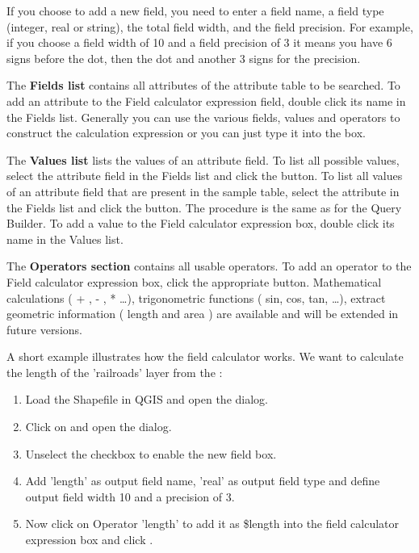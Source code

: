 If you choose to add a new field, you need to enter a field name, a field type 
(integer, real or string), the total field width, and the field precision. 
For example, if you choose a field width of 10 and a field precision of 3 it 
means you have 6 signs before the dot, then the dot and another 3 signs for the 
precision.   

The \textbf{Fields list} contains all attributes of the attribute table to be
searched. To add an attribute to the Field calculator expression field, double 
click its name in the Fields list. Generally you can use the various fields, 
values and operators to construct the calculation expression or you can just 
type it into the box.

The \textbf{Values list} lists the values of an attribute field. To list all 
possible values, select the attribute field in the Fields list and click the
 button. To list all 
values of an attribute field that are present in the sample table, select the 
attribute in the Fields list and click the  button. The procedure is the same as for the Query 
Builder. To add a value to the Field calculator expression box, double click its 
name in the Values list.

The \textbf{Operators section} contains all usable operators. To add an operator
to the Field calculator expression box, click the appropriate button. Mathematical 
calculations ( + , - , * \dots), trigonometric functions ( sin, cos, tan, \dots), 
extract geometric information ( length and area ) are available and will be 
extended in future versions.

A short example illustrates how the field calculator works. We want to calculate 
the length of the 'railroads' layer from the :

\begin{enumerate}
\item Load the Shapefile  in QGIS and open 
the  dialog. 
\item Click on  and 
open the  dialog.
\item Unselect the  checkbox to enable the 
new field box.
\item Add 'length' as output field name, 'real' as output field type and define 
output field width 10 and a precision of 3.
\item Now click on Operator 'length' to add it as \$length into the 
field calculator expression box and click .
\end{enumerate}

